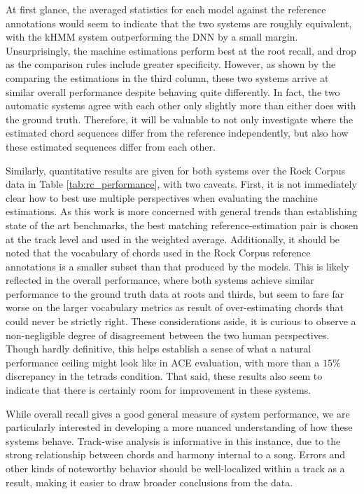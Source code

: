 \documentclass{article}
\begin{document}
At first glance, the averaged statistics for each model against the reference annotations would seem to indicate that the two systems are roughly equivalent, with the kHMM system outperforming the DNN by a small margin.
Unsurprisingly, the machine estimations perform best at the root recall, and drop as the comparison rules include greater specificity.
However, as shown by the comparing the estimations in the third column, these two systems arrive at similar overall performance despite behaving quite differently.
In fact, the two automatic systems agree with each other only slightly more than either does with the ground truth.
Therefore, it will be valuable to not only investigate where the estimated chord sequences differ from the reference independently, but also how these estimated sequences differ from each other.


Similarly, quantitative results are given for both systems over the Rock Corpus data in Table \ref{tab:rc_performance}, with two caveats.
First, it is not immediately clear how to best use multiple perspectives when evaluating the machine estimations.
As this work is more concerned with general trends than establishing state of the art benchmarks, the best matching reference-estimation pair is chosen at the track level and used in the weighted average.
Additionally, it should be noted that the vocabulary of chords used in the Rock Corpus reference annotations is a smaller subset than that produced by the models.
This is likely reflected in the overall performance, where both systems achieve similar performance to the ground truth data at roots and thirds, but seem to fare far worse on the larger vocabulary metrics as result of over-estimating chords that could never be strictly right.
These considerations aside, it is curious to observe a non-negligible degree of disagreement between the two human perspectives.
Though hardly definitive, this helps establish a sense of what a natural performance ceiling might look like in ACE evaluation, with more than a $15\%$ discrepancy in the tetrads condition.
That said, these results also seem to indicate that there is certainly room for improvement in these systems.

While overall recall gives a good general measure of system performance, we are particularly interested in developing a more nuanced understanding of how these systems behave.
Track-wise analysis is informative in this instance, due to the strong relationship between chords and harmony internal to a song.
Errors and other kinds of noteworthy behavior should be well-localized within a track as a result, making it easier to draw broader conclusions from the data.
\end{document}
